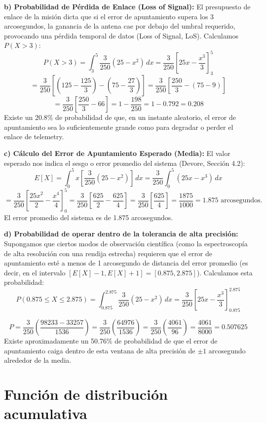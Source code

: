 \textbf{b) Probabilidad de Pérdida de Enlace (Loss of Signal):}
El presupuesto de enlace de la misión dicta que si el error de apuntamiento supera los 3 arcosegundos, la ganancia de la antena cae por debajo del umbral requerido, provocando una pérdida temporal de datos (Loss of Signal, LoS). Calculamos $P(X > 3)$:
$$ P(X > 3) = \int_{3}^{5} \frac{3}{250}(25 - x^2) \, dx = \frac{3}{250} \left[ 25x - \frac{x^3}{3} \right]_{3}^{5} $$
$$ = \frac{3}{250} \left[ \left( 125 - \frac{125}{3} \right) - \left( 75 - \frac{27}{3} \right) \right] = \frac{3}{250} \left[ \frac{250}{3} - (75 - 9) \right] $$
$$ = \frac{3}{250} \left[ \frac{250}{3} - 66 \right] = 1 - \frac{198}{250} = 1 - 0.792 = 0.208 $$
Existe un 20.8\% de probabilidad de que, en un instante aleatorio, el error de apuntamiento sea lo suficientemente grande como para degradar o perder el enlace de telemetry.

\textbf{c) Cálculo del Error de Apuntamiento Esperado (Media):}
El valor esperado nos indica el sesgo o error promedio del sistema (Devore, Sección 4.2):
$$ E[X] = \int_{0}^{5} x \left[ \frac{3}{250}(25 - x^2) \right] \, dx = \frac{3}{250} \int_{0}^{5} (25x - x^3) \, dx $$
$$ = \frac{3}{250} \left[ \frac{25x^2}{2} - \frac{x^4}{4} \right]_{0}^{5} = \frac{3}{250} \left[ \frac{625}{2} - \frac{625}{4} \right] = \frac{3}{250} \left[ \frac{625}{4} \right] = \frac{1875}{1000} = 1.875 \text{ arcosegundos.} $$
El error promedio del sistema es de 1.875 arcosegundos.

\textbf{d) Probabilidad de operar dentro de la tolerancia de alta precisión:}
Supongamos que ciertos modos de observación científica (como la espectroscopía de alta resolución con una rendija estrecha) requieren que el error de apuntamiento esté a menos de 1 arcosegundo de distancia del error promedio (es decir, en el intervalo $[E[X] - 1, E[X] + 1] = [0.875, 2.875]$). Calculamos esta probabilidad:
$$ P(0.875 \le X \le 2.875) = \int_{0.875}^{2.875} \frac{3}{250}(25 - x^2) \, dx = \frac{3}{250} \left[ 25x - \frac{x^3}{3} \right]_{0.875}^{2.875} $$

$$ P = \frac{3}{250} \left( \frac{98233 - 33257}{1536} \right) = \frac{3}{250} \left( \frac{64976}{1536} \right) = \frac{3}{250} \left( \frac{4061}{96} \right) = \frac{4061}{8000} = 0.507625 $$
Existe aproximadamente un 50.76\% de probabilidad de que el error de apuntamiento caiga dentro de esta ventana de alta precisión de $\pm 1$ arcosegundo alrededor de la media.

\section{Función de distribución acumulativa}

